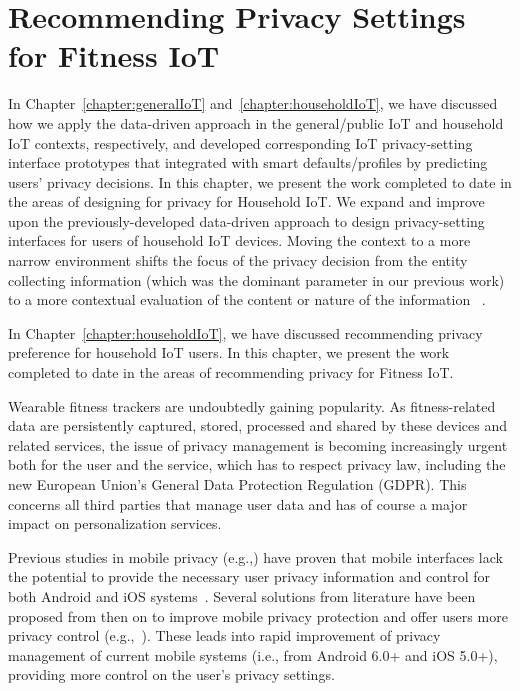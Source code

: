 \chapter{Recommending Privacy Settings for Fitness IoT}\label{chapter:fitnessIoT}

In Chapter~\ref{chapter:generalIoT} and~\ref{chapter:householdIoT}, we have discussed how we apply the data-driven approach in the general/public IoT and household IoT contexts, respectively, and developed corresponding IoT privacy-setting interface prototypes that integrated with smart defaults/profiles by predicting users' privacy decisions. In this chapter, we present the work completed to date in the areas of designing for privacy for Household IoT. We expand and improve upon the previously-developed data-driven approach to design privacy-setting interfaces for users of household IoT devices. Moving the context to a more narrow environment shifts the focus of the privacy decision from the entity collecting information (which was the dominant parameter in our previous work) to a more contextual evaluation of the content or nature of the information ~\cite{nissenbaum_privacy_2004}.

In Chapter~\ref{chapter:householdIoT}, we have discussed recommending privacy preference for household IoT users. In this chapter, we present the work completed to date in the areas of recommending privacy for Fitness IoT. 

Wearable fitness trackers are undoubtedly gaining popularity. As fitness-related data are persistently captured, stored, processed and shared by these devices and related services, the issue of privacy management is becoming increasingly urgent both for the user and the service, which has to respect privacy law, including the new European Union's General Data Protection Regulation (GDPR). This concerns all third parties that manage user data and has of course a major impact on personalization services.

Previous studies in mobile privacy (e.g.,\cite{felt2012android}) have proven that mobile interfaces lack the potential to provide the necessary user privacy information and control for both Android and iOS systems~\cite{lin2014modeling}. Several solutions from literature have been proposed from then on to improve mobile privacy protection and offer users more privacy control (e.g.,~\cite{beresford2011mockdroid}). These leads into rapid improvement of privacy management of current mobile systems (i.e., from Android 6.0+ and iOS 5.0+), providing more control on the user's privacy settings.

